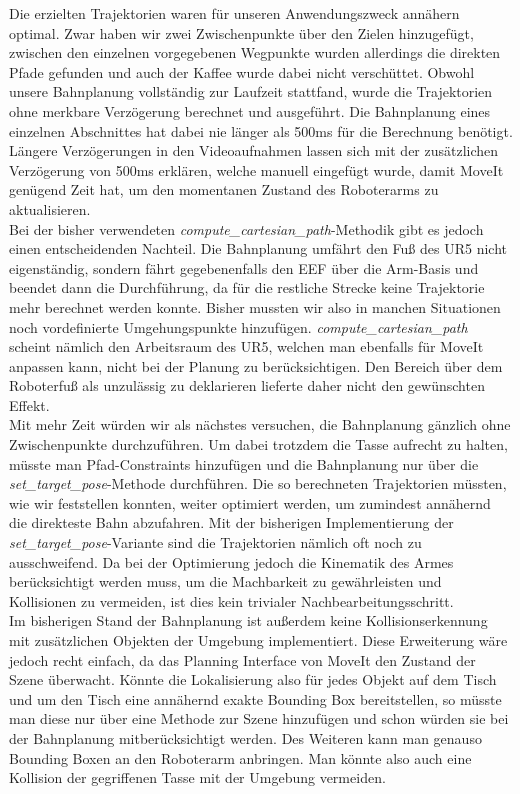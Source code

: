 Die erzielten Trajektorien waren für unseren Anwendungszweck annähern optimal. Zwar haben wir zwei Zwischenpunkte über den Zielen hinzugefügt, zwischen den einzelnen vorgegebenen Wegpunkte wurden allerdings die direkten Pfade gefunden und auch der Kaffee wurde dabei nicht verschüttet.
\newline
Obwohl unsere Bahnplanung vollständig zur Laufzeit stattfand, wurde die Trajektorien ohne merkbare Verzögerung berechnet und ausgeführt. Die Bahnplanung eines einzelnen Abschnittes hat dabei nie länger als 500ms für die Berechnung benötigt. Längere Verzögerungen in den Videoaufnahmen lassen sich mit der zusätzlichen Verzögerung von 500ms erklären, welche manuell eingefügt wurde, damit MoveIt genügend Zeit hat, um den momentanen Zustand des Roboterarms zu aktualisieren.
\newline \\
Bei der bisher verwendeten \textit{compute\_cartesian\_path}-Methodik gibt es jedoch einen entscheidenden Nachteil. Die Bahnplanung umfährt den Fuß des UR5 nicht eigenständig, sondern fährt gegebenenfalls den EEF über die Arm-Basis und beendet dann die Durchführung, da für die restliche Strecke keine Trajektorie mehr berechnet werden konnte. Bisher mussten wir also in manchen Situationen noch vordefinierte Umgehungspunkte hinzufügen. \textit{compute\_cartesian\_path} scheint nämlich den Arbeitsraum des UR5, welchen man ebenfalls für MoveIt anpassen kann, nicht bei der Planung zu berücksichtigen. Den Bereich über dem Roboterfuß als unzulässig zu deklarieren lieferte daher nicht den gewünschten Effekt.
\newline \\
Mit mehr Zeit würden wir als nächstes versuchen, die Bahnplanung gänzlich ohne Zwischenpunkte durchzuführen. Um dabei trotzdem die Tasse aufrecht zu halten, müsste man Pfad-Constraints hinzufügen und die Bahnplanung nur über die \textit{set\_target\_pose}-Methode durchführen.
\newline
Die so berechneten Trajektorien müssten, wie wir feststellen konnten, weiter optimiert werden, um zumindest annähernd die direkteste Bahn abzufahren. Mit der bisherigen Implementierung der \textit{set\_target\_pose}-Variante sind die Trajektorien nämlich oft noch zu ausschweifend. Da bei der Optimierung jedoch die Kinematik des Armes berücksichtigt werden muss, um die Machbarkeit zu gewährleisten und Kollisionen zu vermeiden, ist dies kein trivialer Nachbearbeitungsschritt.
\newline \\
Im bisherigen Stand der Bahnplanung ist außerdem keine Kollisionserkennung mit zusätzlichen Objekten der Umgebung implementiert. Diese Erweiterung wäre jedoch recht einfach, da das Planning Interface von MoveIt den Zustand der Szene überwacht. Könnte die Lokalisierung also für jedes Objekt auf dem Tisch und um den Tisch eine annähernd exakte Bounding Box bereitstellen, so müsste man diese nur über eine Methode zur Szene hinzufügen und schon würden sie bei der Bahnplanung mitberücksichtigt werden. Des Weiteren kann man genauso Bounding Boxen an den Roboterarm anbringen. Man könnte also auch eine Kollision der gegriffenen Tasse mit der Umgebung vermeiden.